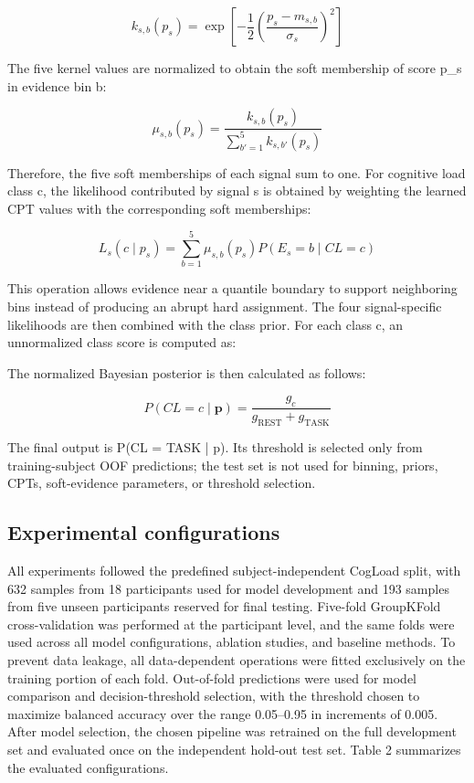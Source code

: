 \documentclass[runningheads]{llncs}
\begin{document}
\begin{equation*}k_{s,b}(p_s)=\exp\!\left[-\frac{1}{2}\left(\frac{p_s-m_{s,b}}{\sigma_s}\right)^2\right]\end{equation*}

The five kernel values are normalized to obtain the soft membership of score p\_s in evidence bin b:

\begin{equation}\mu_{s,b}(p_s)=\frac{k_{s,b}(p_s)}{\sum_{b\prime=1}^{5}k_{s,b\prime}(p_s)}\tag{17}\end{equation}

Therefore, the five soft memberships of each signal sum to one. For cognitive load class c, the likelihood contributed by signal s is obtained by weighting the learned CPT values with the corresponding soft memberships:

\begin{equation}L_s(c\mid p_s)=\sum_{b=1}^{5}\mu_{s,b}(p_s)P(E_s=b\mid CL=c)\tag{18}\end{equation}

This operation allows evidence near a quantile boundary to support neighboring bins instead of producing an abrupt hard assignment. The four signal-specific likelihoods are then combined with the class prior. For each class c, an unnormalized class score is computed as:

The normalized Bayesian posterior is then calculated as follows:

\begin{equation}P(CL=c\mid\mathbf p)=\frac{g_c}{g_{\mathrm{REST}}+g_{\mathrm{TASK}}}\tag{19}\end{equation}

The final output is P(CL = TASK | p). Its threshold is selected only from training-subject OOF predictions; the test set is not used for binning, priors, CPTs, soft-evidence parameters, or threshold selection.

\subsection{Experimental configurations}

All experiments followed the predefined subject-independent CogLoad split, with 632 samples from 18 participants used for model development and 193 samples from five unseen participants reserved for final testing. Five-fold GroupKFold cross-validation was performed at the participant level, and the same folds were used across all model configurations, ablation studies, and baseline methods. To prevent data leakage, all data-dependent operations were fitted exclusively on the training portion of each fold. Out-of-fold predictions were used for model comparison and decision-threshold selection, with the threshold chosen to maximize balanced accuracy over the range 0.05--0.95 in increments of 0.005. After model selection, the chosen pipeline was retrained on the full development set and evaluated once on the independent hold-out test set. Table 2 summarizes the evaluated configurations.
\end{document}
